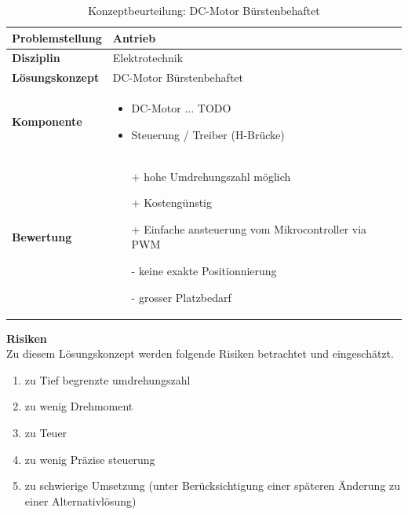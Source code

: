 \documentclass[../../../main.tex]{subfiles}
\begin{document}
    \begin{flushleft}
        \begin{table}[H]
        \begin{tabular}{ | l | p{11cm} |}
        \hline
        \textbf{Problemstellung} & Antrieb \\ \hline
        \textbf{Disziplin} & Elektrotechnik \\ \hline
        \textbf{Lösungskonzept} & DC-Motor Bürstenbehaftet\\ \hline
        \textbf{Komponente} & \begin{itemize}
            \item DC-Motor ... TODO
            \item Steuerung / Treiber (H-Brücke)
            \end{itemize}\\ \hline
        \textbf{Bewertung} &  \begin{itemize}
                                \item[+] hohe Umdrehungszahl möglich 
                                \item[+] Kostengünstig 
                                \item[+] Einfache ansteuerung vom Mikrocontroller via PWM 
                                \item[-] keine exakte Positionnierung
                                \item[-] grosser Platzbedarf
                              \end{itemize} \\ \hline
        \end{tabular}
        \caption{Konzeptbeurteilung: DC-Motor Bürstenbehaftet}
        \label{tab:antr_konzept_dcMotor_buerstenbehaftet}
    \end{table}
    \end{flushleft}

    \textbf{Risiken}\\
    Zu diesem Lösungskonzept werden folgende Risiken betrachtet und eingeschätzt.
    \begin{enumerate}[I]
        \item zu Tief begrenzte umdrehungszahl
        \item zu wenig Drehmoment
        \item zu Teuer
        \item zu wenig Präzise steuerung
        \item zu schwierige Umsetzung (unter Berücksichtigung einer späteren Änderung zu einer Alternativlösung)  
    \end{enumerate}
\end{document}
